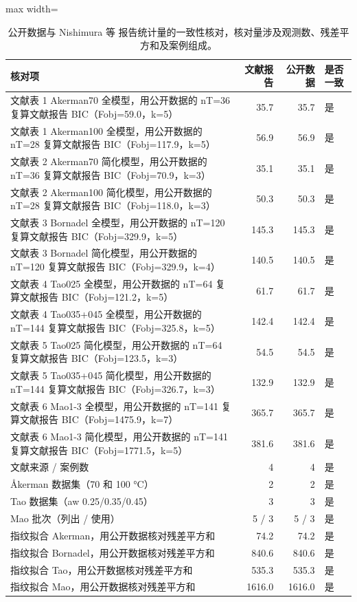 \begin{table}[t]
\centering
\caption{公开数据与 Nishimura 等 \cite{nishimura2026} 报告统计量的一致性核对，核对量涉及观测数、残差平方和及案例组成。}\label{tab:datacheck}
\scriptsize
\begin{adjustbox}{max width=\linewidth}
\begin{tabular}{p{9.2cm}rrl}
\toprule
核对项 & 文献报告 & 公开数据 & 是否一致 \\
\midrule
文献表 1 Akerman70 全模型，用公开数据的 nT=36 复算文献报告 BIC（Fobj=59.0，k=5） & 35.7 & 35.7 & 是 \\
文献表 1 Akerman100 全模型，用公开数据的 nT=28 复算文献报告 BIC（Fobj=117.9，k=5） & 56.9 & 56.9 & 是 \\
文献表 2 Akerman70 简化模型，用公开数据的 nT=36 复算文献报告 BIC（Fobj=70.9，k=3） & 35.1 & 35.1 & 是 \\
文献表 2 Akerman100 简化模型，用公开数据的 nT=28 复算文献报告 BIC（Fobj=118.0，k=3） & 50.3 & 50.3 & 是 \\
文献表 3 Bornadel 全模型，用公开数据的 nT=120 复算文献报告 BIC（Fobj=329.9，k=5） & 145.3 & 145.3 & 是 \\
文献表 3 Bornadel 简化模型，用公开数据的 nT=120 复算文献报告 BIC（Fobj=329.9，k=4） & 140.5 & 140.5 & 是 \\
文献表 4 Tao025 全模型，用公开数据的 nT=64 复算文献报告 BIC（Fobj=121.2，k=5） & 61.7 & 61.7 & 是 \\
文献表 4 Tao035+045 全模型，用公开数据的 nT=144 复算文献报告 BIC（Fobj=325.8，k=5） & 142.4 & 142.4 & 是 \\
文献表 5 Tao025 简化模型，用公开数据的 nT=64 复算文献报告 BIC（Fobj=123.5，k=3） & 54.5 & 54.5 & 是 \\
文献表 5 Tao035+045 简化模型，用公开数据的 nT=144 复算文献报告 BIC（Fobj=326.7，k=3） & 132.9 & 132.9 & 是 \\
文献表 6 Mao1-3 全模型，用公开数据的 nT=141 复算文献报告 BIC（Fobj=1475.9，k=7） & 365.7 & 365.7 & 是 \\
文献表 6 Mao1-3 简化模型，用公开数据的 nT=141 复算文献报告 BIC（Fobj=1771.5，k=5） & 381.6 & 381.6 & 是 \\
文献来源 / 案例数 & 4 & 4 & 是 \\
Åkerman 数据集（70 和 100 °C） & 2 & 2 & 是 \\
Tao 数据集（aw 0.25/0.35/0.45） & 3 & 3 & 是 \\
Mao 批次（列出 / 使用） & 5 / 3 & 5 / 3 & 是 \\
指纹拟合 Akerman，用公开数据核对残差平方和 & 74.2 & 74.2 & 是 \\
指纹拟合 Bornadel，用公开数据核对残差平方和 & 840.6 & 840.6 & 是 \\
指纹拟合 Tao，用公开数据核对残差平方和 & 535.3 & 535.3 & 是 \\
指纹拟合 Mao，用公开数据核对残差平方和 & 1616.0 & 1616.0 & 是 \\
\bottomrule
\end{tabular}
\end{adjustbox}
\end{table}
